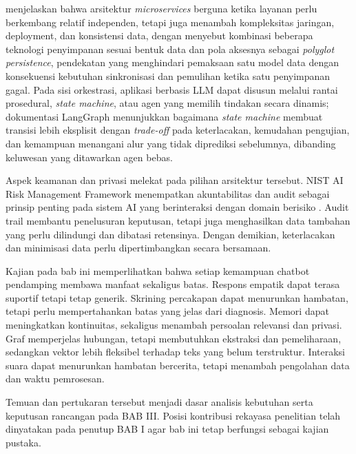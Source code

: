 \textcite{newman2021microservices} menjelaskan bahwa arsitektur \textit{microservices} berguna ketika layanan perlu berkembang relatif independen, tetapi juga menambah kompleksitas jaringan, deployment, dan konsistensi data, dengan \textcite{kleppmann2017ddia} menyebut kombinasi beberapa teknologi penyimpanan sesuai bentuk data dan pola aksesnya sebagai \textit{polyglot persistence}, pendekatan yang menghindari pemaksaan satu model data dengan konsekuensi kebutuhan sinkronisasi dan pemulihan ketika satu penyimpanan gagal. Pada sisi orkestrasi, aplikasi berbasis LLM dapat disusun melalui rantai prosedural, \textit{state machine}, atau agen yang memilih tindakan secara dinamis; dokumentasi LangGraph \parencite{langchainLanggraph2024} menunjukkan bagaimana \textit{state machine} membuat transisi lebih eksplisit dengan \textit{trade-off} pada keterlacakan, kemudahan pengujian, dan kemampuan menangani alur yang tidak diprediksi sebelumnya, dibanding keluwesan yang ditawarkan agen bebas.

Aspek keamanan dan privasi melekat pada pilihan arsitektur tersebut. NIST AI Risk Management Framework menempatkan akuntabilitas dan audit sebagai prinsip penting pada sistem AI yang berinteraksi dengan domain berisiko \parencite{nistAirmf2023}. Audit trail membantu penelusuran keputusan, tetapi juga menghasilkan data tambahan yang perlu dilindungi dan dibatasi retensinya. Dengan demikian, keterlacakan dan minimisasi data perlu dipertimbangkan secara bersamaan.

Kajian pada bab ini memperlihatkan bahwa setiap kemampuan chatbot pendamping membawa manfaat sekaligus batas. Respons empatik dapat terasa suportif tetapi tetap generik. Skrining percakapan dapat menurunkan hambatan, tetapi perlu mempertahankan batas yang jelas dari diagnosis. Memori dapat meningkatkan kontinuitas, sekaligus menambah persoalan relevansi dan privasi. Graf memperjelas hubungan, tetapi membutuhkan ekstraksi dan pemeliharaan, sedangkan vektor lebih fleksibel terhadap teks yang belum terstruktur. Interaksi suara dapat menurunkan hambatan bercerita, tetapi menambah pengolahan data dan waktu pemrosesan.

Temuan dan pertukaran tersebut menjadi dasar analisis kebutuhan serta keputusan rancangan pada BAB III. Posisi kontribusi rekayasa penelitian telah dinyatakan pada penutup BAB I agar bab ini tetap berfungsi sebagai kajian pustaka.

